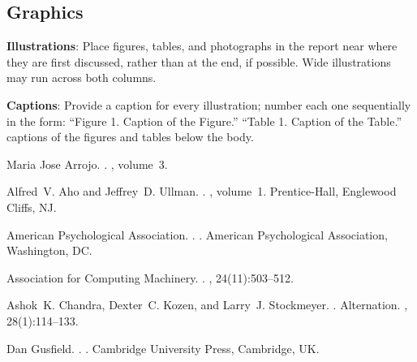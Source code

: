 \documentclass[11pt]{article}
\begin{document}
\subsection{Graphics}

{\bf Illustrations}: Place figures, tables, and photographs in the
report near where they are first discussed, rather than at the end, if
possible.  Wide illustrations may run across both columns.

{\bf Captions}: Provide a caption for every illustration; number each one
sequentially in the form:  ``Figure 1. Caption of the Figure.'' ``Table 1.
Caption of the Table.''  captions of the figures and
tables below the body.

\begin{thebibliography}{}

Maria Jose Arrojo.
.
, volume~3.

Alfred~V. Aho and Jeffrey~D. Ullman.
.
, volume~1.
\newblock Prentice-{Hall}, Englewood Cliffs, NJ.

{American Psychological Association}.
.
.
\newblock American Psychological Association, Washington, DC.

{Association for Computing Machinery}.
.
, 24(11):503--512.

Ashok~K. Chandra, Dexter~C. Kozen, and Larry~J. Stockmeyer.
.
\newblock Alternation.
,
  28(1):114--133.

Dan Gusfield.
.
.
\newblock Cambridge University Press, Cambridge, UK.

\end{thebibliography}
\end{document}
